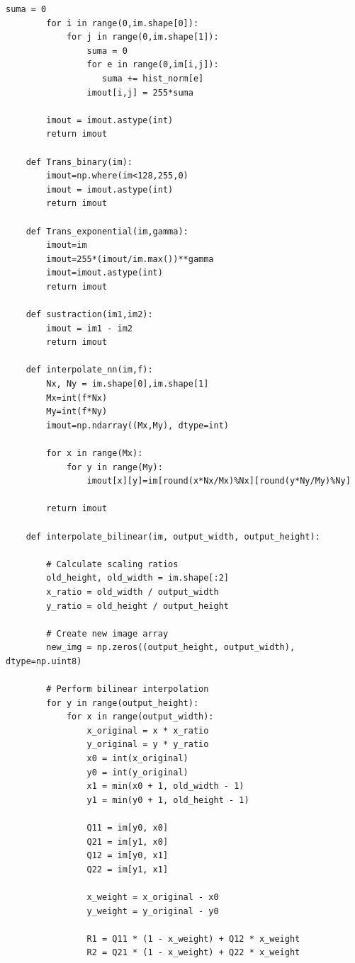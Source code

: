 \documentclass[letterpaper,12pt]{article}
\theoremstyle{plain}
\begin{document}
\begin{onecolumn}
\begin{lstlisting}[style=mystyle]
        suma = 0
        for i in range(0,im.shape[0]):
            for j in range(0,im.shape[1]):
                suma = 0
                for e in range(0,im[i,j]):
                   suma += hist_norm[e]
                imout[i,j] = 255*suma
    
        imout = imout.astype(int)
        return imout
    
    def Trans_binary(im):
        imout=np.where(im<128,255,0)
        imout = imout.astype(int)
        return imout
    
    def Trans_exponential(im,gamma):
        imout=im
        imout=255*(imout/im.max())**gamma
        imout=imout.astype(int)
        return imout
    
    def sustraction(im1,im2):
        imout = im1 - im2
        return imout
    
    def interpolate_nn(im,f):
        Nx, Ny = im.shape[0],im.shape[1]
        Mx=int(f*Nx)
        My=int(f*Ny)
        imout=np.ndarray((Mx,My), dtype=int)
    
        for x in range(Mx):
            for y in range(My):
                imout[x][y]=im[round(x*Nx/Mx)%Nx][round(y*Ny/My)%Ny]
    
        return imout
    
    def interpolate_bilinear(im, output_width, output_height):
    
        # Calculate scaling ratios
        old_height, old_width = im.shape[:2]
        x_ratio = old_width / output_width
        y_ratio = old_height / output_height
    
        # Create new image array
        new_img = np.zeros((output_height, output_width), dtype=np.uint8)
    
        # Perform bilinear interpolation
        for y in range(output_height):
            for x in range(output_width):
                x_original = x * x_ratio
                y_original = y * y_ratio
                x0 = int(x_original)
                y0 = int(y_original)
                x1 = min(x0 + 1, old_width - 1)
                y1 = min(y0 + 1, old_height - 1)
    
                Q11 = im[y0, x0]
                Q21 = im[y1, x0]
                Q12 = im[y0, x1]
                Q22 = im[y1, x1]
    
                x_weight = x_original - x0
                y_weight = y_original - y0
    
                R1 = Q11 * (1 - x_weight) + Q12 * x_weight
                R2 = Q21 * (1 - x_weight) + Q22 * x_weight
    

\end{lstlisting}
\end{onecolumn}
\end{document}
